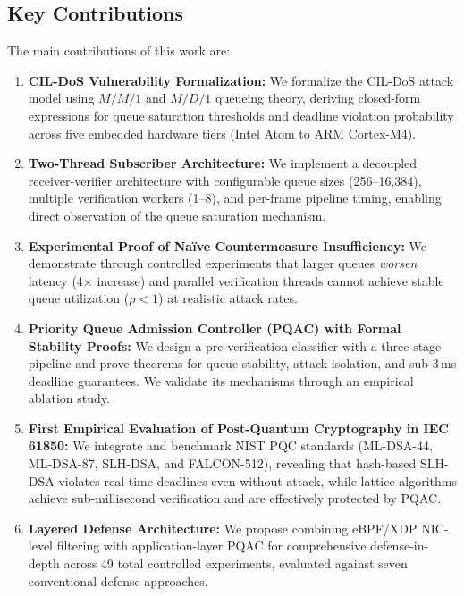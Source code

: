 \documentclass{ieeeaccess}
\begin{document}
\subsection{Key Contributions}
The main contributions of this work are:
\begin{enumerate}[leftmargin=*]
    \item \textbf{CIL-DoS Vulnerability Formalization:} We formalize the CIL-DoS attack model using $M/M/1$ and $M/D/1$ queueing theory, deriving closed-form expressions for queue saturation thresholds and deadline violation probability across five embedded hardware tiers (Intel Atom to ARM Cortex-M4).
    \item \textbf{Two-Thread Subscriber Architecture:} We implement a decoupled receiver-verifier architecture with configurable queue sizes (256--16,384), multiple verification workers (1--8), and per-frame pipeline timing, enabling direct observation of the queue saturation mechanism.
    \item \textbf{Experimental Proof of Na\"ive Countermeasure Insufficiency:} We demonstrate through controlled experiments that larger queues \emph{worsen} latency (4$\times$ increase) and parallel verification threads cannot achieve stable queue utilization ($\rho < 1$) at realistic attack rates.
    \item \textbf{Priority Queue Admission Controller (PQAC) with Formal Stability Proofs:} We design a pre-verification classifier with a three-stage pipeline and prove theorems for queue stability, attack isolation, and sub-3\,ms deadline guarantees. We validate its mechanisms through an empirical ablation study.
    \item \textbf{First Empirical Evaluation of Post-Quantum Cryptography in IEC 61850:} We integrate and benchmark NIST PQC standards (ML-DSA-44, ML-DSA-87, SLH-DSA, and FALCON-512), revealing that hash-based SLH-DSA violates real-time deadlines even without attack, while lattice algorithms achieve sub-millisecond verification and are effectively protected by PQAC.
    \item \textbf{Layered Defense Architecture:} We propose combining eBPF/XDP NIC-level filtering with application-layer PQAC for comprehensive defense-in-depth across 49 total controlled experiments, evaluated against seven conventional defense approaches.
\end{enumerate}
\end{document}
